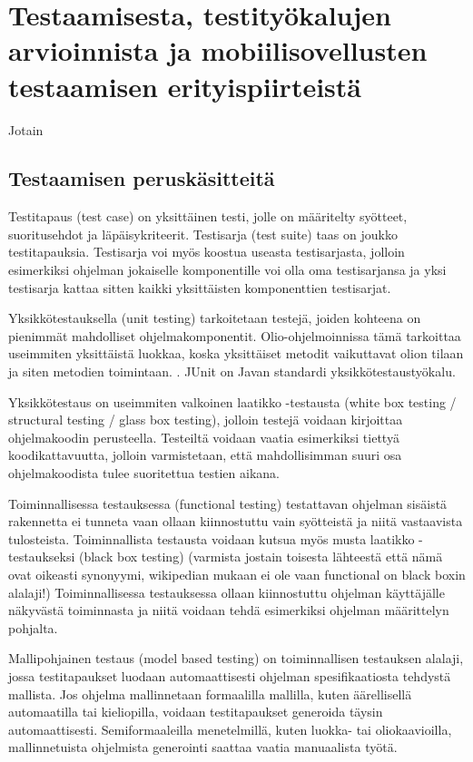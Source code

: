 \section{Testaamisesta, testityökalujen arvioinnista ja mobiilisovellusten testaamisen erityispiirteistä}

Jotain

\subsection{Testaamisen peruskäsitteitä}

Testitapaus (test case) on yksittäinen testi, jolle on määritelty syötteet, suoritusehdot ja läpäisykriteerit. Testisarja (test suite) taas on joukko testitapauksia. Testisarja voi myös koostua useasta testisarjasta, jolloin esimerkiksi ohjelman jokaiselle komponentille voi olla oma testisarjansa ja yksi testisarja kattaa sitten kaikki yksittäisten komponenttien testisarjat. \cite[153]{testing}

Yksikkötestauksella (unit testing) tarkoitetaan testejä, joiden kohteena on pienimmät mahdolliset ohjelmakomponentit. Olio-ohjelmoinnissa tämä tarkoittaa useimmiten yksittäistä luokkaa, koska yksittäiset metodit vaikuttavat olion tilaan ja siten metodien toimintaan. \cite[282-286]{testing}. JUnit \cite{junit} on Javan standardi yksikkötestaustyökalu.

Yksikkötestaus on useimmiten valkoinen laatikko -testausta (white box testing / structural testing / glass box testing), jolloin testejä voidaan kirjoittaa ohjelmakoodin perusteella. Testeiltä voidaan vaatia esimerkiksi tiettyä koodikattavuutta, jolloin varmistetaan, että mahdollisimman suuri osa ohjelmakoodista tulee suoritettua testien aikana. \cite[154]{testing}

Toiminnallisessa testauksessa (functional testing) testattavan ohjelman sisäistä rakennetta ei tunneta vaan ollaan kiinnostuttu vain syötteistä ja niitä vastaavista tulosteista. Toiminnallista testausta voidaan kutsua myös musta laatikko -testaukseksi (black box testing) (varmista jostain toisesta lähteestä että nämä ovat oikeasti synonyymi, wikipedian mukaan ei ole vaan functional on black boxin alalaji!) Toiminnallisessa testauksessa ollaan kiinnostuttu ohjelman käyttäjälle näkyvästä toiminnasta ja niitä voidaan tehdä esimerkiksi ohjelman määrittelyn pohjalta. \cite[161-162]{testing}

Mallipohjainen testaus (model based testing) on toiminnallisen testauksen alalaji, jossa testitapaukset luodaan automaattisesti ohjelman spesifikaatiosta tehdystä mallista. Jos ohjelma mallinnetaan formaalilla mallilla, kuten äärellisellä automaatilla tai kieliopilla, voidaan testitapaukset generoida täysin automaattisesti. Semiformaaleilla menetelmillä, kuten luokka- tai oliokaavioilla, mallinnetuista ohjelmista generointi saattaa vaatia manuaalista työtä. \cite[245-250]{testing}

